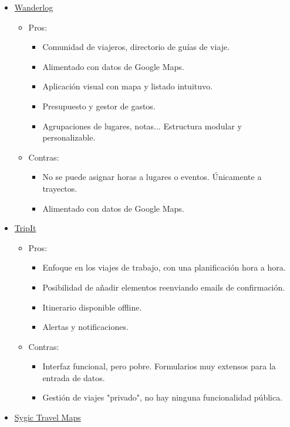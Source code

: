 \begin{itemize}
   \item \href{https://wanderlog.com/}{Wanderlog}
   \begin{itemize}
     \item Pros:
     \begin{itemize}
		\item Comunidad de viajeros, directorio de guías de viaje.
        \item Alimentado con datos de Google Maps.
        \item Aplicación visual con mapa y listado intuituvo.
        \item Presupuesto y gestor de gastos.
        \item Agrupaciones de lugares, notas... Estructura modular y personalizable.
     \end{itemize}
     \item Contras:
     \begin{itemize}
		\item No se puede asignar horas a lugares o eventos. Únicamente a trayectos.
        \item Alimentado con datos de Google Maps.
     \end{itemize}
   \end{itemize}
   \item \href{https://www.tripit.com}{TripIt}
   \begin{itemize}
     \item Pros:
     \begin{itemize}
		\item Enfoque en los viajes de trabajo, con una planificación hora a hora.
        \item Posibilidad de añadir elementos reenviando emails de confirmación.
        \item Itinerario disponible offline.
        \item Alertas y notificaciones.
     \end{itemize}
     \item Contras:
     \begin{itemize}
		\item Interfaz funcional, pero pobre. Formularios muy extensos para la entrada de datos.
        \item Gestión de viajes "privado", no hay ninguna funcionalidad pública.
     \end{itemize}
   \end{itemize}
   \item \href{https://travel.sygic.com}{Sygic Travel Maps}

\end{itemize}
